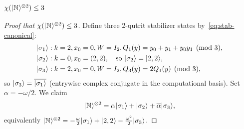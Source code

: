 \documentclass[11pt]{article}
\theoremstyle{definition}
\newcommand{\microspace}{\mspace{0.5mu}}
\newcommand{\ket}[1]{\lvert\microspace #1 \microspace \rangle}
\newcommand{\chiR}{\chi}
\newcommand{\Norrell}{\ket{\mathbb{N}}}
\begin{document}
	\subsubsection{\texorpdfstring{$\chiR(\Norrell^{\otimes 2}) \le 3$}{chi(N tensor 2) <= 3}}\label{app:norrell-m2}
	
	\begin{proof}[Proof that $\chiR(\Norrell^{\otimes 2}) \le 3$]
		Define three 2-qutrit stabilizer states by~\eqref{eq:stab-canonical}:
		\begin{equation}\label{eq:norrell-m2-states}
			\begin{aligned}
				\ket{\sigma_1} &: k = 2, x_0 = 0, W = I_2, 
				Q_1(y) = y_0 + y_1 + y_0 y_1 \pmod 3, \\
				\ket{\sigma_2} &: k = 0, x_0 = (2, 2),
				\quad \text{so } \ket{\sigma_2} = \ket{2, 2}, \\
				\ket{\sigma_3} &: k = 2, x_0 = 0, W = I_2, 
				Q_3(y) = 2  Q_1(y) \pmod 3,
			\end{aligned}
		\end{equation}
		so $\ket{\sigma_3} = \overline{\ket{\sigma_1}}$ (entrywise complex conjugate in
		the computational basis). Set $\alpha = -\omega/2$. We claim
		\begin{equation}\label{eq:norrell-m2-id}
			\Norrell^{\otimes 2}
			= \alpha  \ket{\sigma_1} + \ket{\sigma_2} + \overline{\alpha}  \ket{\sigma_3},
		\end{equation}
		equivalently
		$\Norrell^{\otimes 2} = -\frac{\omega}{2} \ket{\sigma_1} + \ket{2, 2}
		- \frac{\omega^2}{2} \ket{\sigma_3}$.
		

\end{proof}
\end{document}
